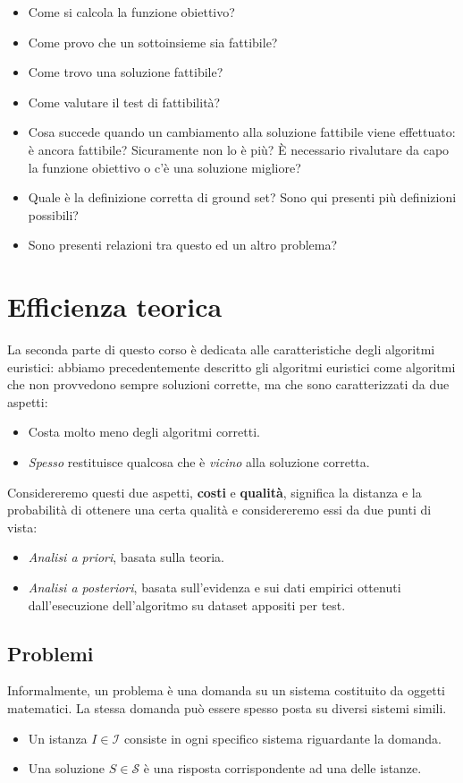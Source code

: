 \documentclass{article}
\begin{document}
\begin{itemize}
    \item Come si calcola la funzione obiettivo?
    \item Come provo che un sottoinsieme sia fattibile?
    \item Come trovo una soluzione fattibile?
    \item Come valutare il test di fattibilità?
    \item Cosa succede quando un cambiamento alla soluzione fattibile viene effettuato: è ancora fattibile?
          Sicuramente non lo è più? È necessario rivalutare da capo la funzione obiettivo o c'è una soluzione migliore?
    \item Quale è la definizione corretta di ground set? Sono qui presenti più definizioni possibili?
    \item Sono presenti relazioni tra questo ed un altro problema?
\end{itemize}

\section{Efficienza teorica}
La seconda parte di questo corso è dedicata alle caratteristiche degli algoritmi euristici: abbiamo precedentemente
descritto gli algoritmi euristici come algoritmi che non provvedono sempre soluzioni corrette, ma che sono
caratterizzati da due aspetti:
\begin{itemize}
    \item Costa molto meno degli algoritmi corretti.
    \item \textit{Spesso} restituisce qualcosa che è \textit{vicino} alla soluzione corretta.
\end{itemize}

Considereremo questi due aspetti, \textbf{costi} e \textbf{qualità}, significa la distanza e la probabilità
di ottenere una certa qualità e considereremo essi da due punti di vista:
\begin{itemize}
    \item \textit{Analisi a priori}, basata sulla teoria.
    \item \textit{Analisi a posteriori}, basata sull'evidenza e sui dati empirici ottenuti dall'esecuzione dell'algoritmo
          su dataset appositi per test.
\end{itemize}

\subsection{Problemi}
Informalmente, un problema è una domanda su un sistema costituito da oggetti matematici. La stessa domanda può
essere spesso posta su diversi sistemi simili.
\begin{itemize}
    \item Un istanza $I\in\mathcal{I}$ consiste in ogni specifico sistema riguardante la domanda.
    \item Una soluzione $S\in\mathcal{S}$ è una risposta corrispondente ad una delle istanze.
\end{itemize}
\end{document}
